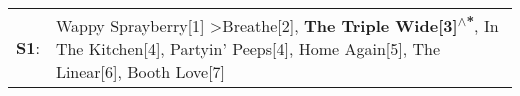 \begin{supertabular}{p{0.03\textwidth}p{0.92\textwidth}}
 \textbf{S1}:  &  Wappy Sprayberry[1]\textsuperscript{} \textgreater \enspace Breathe[2]\textsuperscript{}, \enspace \textbf{The Triple Wide[3]\textsuperscript{$\wedge$*}}, \enspace In The Kitchen[4]\textsuperscript{}, \enspace Partyin' Peeps[4]\textsuperscript{}, \enspace Home Again[5]\textsuperscript{}, \enspace The Linear[6]\textsuperscript{}, \enspace Booth Love[7]\textsuperscript{}  \enspace  \\
\end{supertabular}
